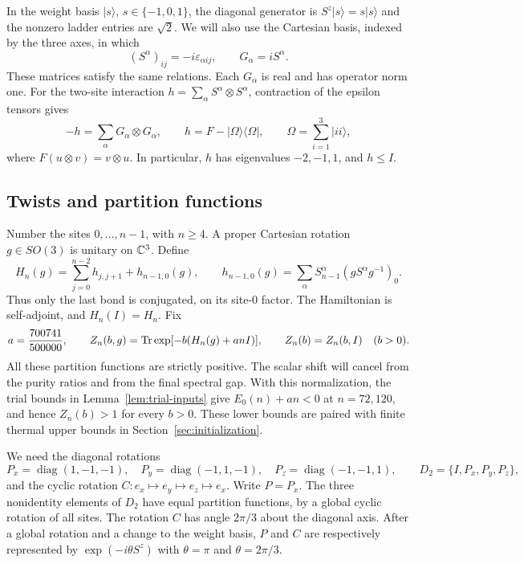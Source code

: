In the weight basis $|s\rangle$, $s\in\{-1,0,1\}$, the diagonal generator
is $S^z|s\rangle=s|s\rangle$ and the nonzero ladder entries are $\sqrt2$.
We will also use the Cartesian basis, indexed by the three axes, in which
\[
 (S^\alpha)_{ij}=-i\varepsilon_{\alpha i j},\qquad
 G_\alpha=iS^\alpha.
\]
These matrices satisfy the same relations. Each $G_\alpha$ is real and
has operator norm one. For the two-site interaction
$h=\sum_\alpha S^\alpha\otimes S^\alpha$, contraction of the epsilon
tensors gives
\begin{equation}\label{eq:cartesian-bond}
 -h=\sum_\alpha G_\alpha\otimes G_\alpha,
 \qquad h=F-|\Omega\rangle\langle\Omega|,
 \qquad \Omega=\sum_{i=1}^3|ii\rangle,
\end{equation}
where $F(u\otimes v)=v\otimes u$. In particular, $h$ has eigenvalues
$-2,-1,1$, and $h\le I$.

\subsection{Twists and partition functions}

Number the sites $0,\ldots,n-1$, with $n\ge4$. A proper Cartesian rotation
$g\in SO(3)$ is unitary on $\mathbb C^3$. Define
\begin{equation}\label{eq:twisted-hamiltonian}
 H_n(g)=\sum_{j=0}^{n-2}h_{j,j+1}+h_{n-1,0}(g),
 \qquad
 h_{n-1,0}(g)=\sum_\alpha
 S_{n-1}^\alpha(gS^\alpha g^{-1})_0.
\end{equation}
Thus only the last bond is conjugated, on its site-$0$ factor. The
Hamiltonian is self-adjoint, and $H_n(I)=H_n$. Fix
\begin{equation}\label{eq:shift}
 a=\frac{700741}{500000},\qquad
 Z_n(b,g)=\operatorname{Tr}\exp[-b(H_n(g)+anI)],\qquad Z_n(b)=Z_n(b,I)
 \quad (b>0).
\end{equation}
All these partition functions are strictly positive. The scalar shift
will cancel from the purity ratios and from the final spectral gap.
With this normalization, the trial bounds in Lemma~\ref{lem:trial-inputs}
give $E_0(n)+an<0$ at $n=72,120$, and hence $Z_n(b)>1$ for every $b>0$.
These lower bounds are paired with finite thermal upper bounds in
Section~\ref{sec:initialization}.

We need the diagonal rotations
\[
 P_x=\operatorname{diag}(1,-1,-1),\quad
 P_y=\operatorname{diag}(-1,1,-1),\quad
 P_z=\operatorname{diag}(-1,-1,1),\qquad
 D_2=\{I,P_x,P_y,P_z\},
\]
and the cyclic rotation $C:e_x\mapsto e_y\mapsto e_z\mapsto e_x$.
Write $P=P_x$. The three nonidentity elements of $D_2$ have equal
partition functions, by a global cyclic rotation of all sites. The
rotation $C$ has angle $2\pi/3$ about the diagonal axis. After a global
rotation and a change to the weight basis, $P$ and $C$ are respectively
represented by $\exp(-i\theta S^z)$ with $\theta=\pi$ and
$\theta=2\pi/3$.

